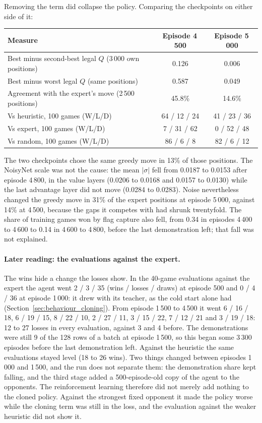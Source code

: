 Removing the term did collapse the policy. Comparing the checkpoints on either side of it:

\begin{center}
\small
\begin{tabular}{lcc}
\toprule
Measure & Episode 4\,500 & Episode 5\,000 \\
\midrule
Best minus second-best legal $Q$ (3\,000 own positions) & 0.126 & 0.006 \\
Best minus worst legal $Q$ (same positions) & 0.587 & 0.049 \\
Agreement with the expert's move (2\,500 positions) & 45.8\% & 14.6\% \\
Vs heuristic, 100 games (W/L/D) & 64 / 12 / 24 & 41 / 23 / 36 \\
Vs expert, 100 games (W/L/D) & 7 / 31 / 62 & 0 / 52 / 48 \\
Vs random, 100 games (W/L/D) & 86 / 6 / 8 & 82 / 6 / 12 \\
\bottomrule
\end{tabular}
\end{center}
The two checkpoints chose the same greedy move in 13\% of those positions. The NoisyNet scale was not
the cause: the mean $|\sigma|$ fell from 0.0187 to 0.0153 after episode 4\,800, in the value layers
(0.0206 to 0.0168 and 0.0157 to 0.0130) while the last advantage layer did not move (0.0284 to 0.0283).
Noise nevertheless changed the greedy move in 31\% of the expert positions at episode 5\,000, against
14\% at 4\,500, because the gaps it competes with had shrunk twentyfold. The share of training games won by flag
capture also fell, from 0.34 in episodes 4\,400 to 4\,600 to 0.14 in 4\,600 to 4\,800, before the last
demonstration left; that fall was not explained.

\paragraph{Later reading: the evaluations against the expert.} The wins hide a change the losses
show. In the 40-game evaluations against the expert the agent went 2 / 3 / 35 (wins / losses /
draws) at episode 500 and 0 / 4 / 36 at episode 1\,000: it drew with its teacher, as the cold start
alone had (Section~\ref{sec:behaviour_cloning}). From episode 1\,500 to 4\,500 it went 6 / 16 / 18,
6 / 19 / 15, 8 / 22 / 10, 2 / 27 / 11, 3 / 15 / 22, 7 / 12 / 21 and 3 / 19 / 18: 12 to 27 losses in
every evaluation, against 3 and 4 before. The demonstrations were still 9 of the 128 rows of a
batch at episode 1\,500, so this began some 3\,300 episodes before the last demonstration left.
Against the heuristic the same evaluations stayed level (18 to 26 wins). Two things changed between
episodes 1\,000 and 1\,500, and the run does not separate them: the demonstration share kept
falling, and the third stage added a 500-episode-old copy of the agent to the opponents. The
reinforcement learning therefore did not merely add nothing to the cloned policy. Against the
strongest fixed opponent it made the policy worse while the cloning term was still in the loss,
and the evaluation against the weaker heuristic did not show it.

